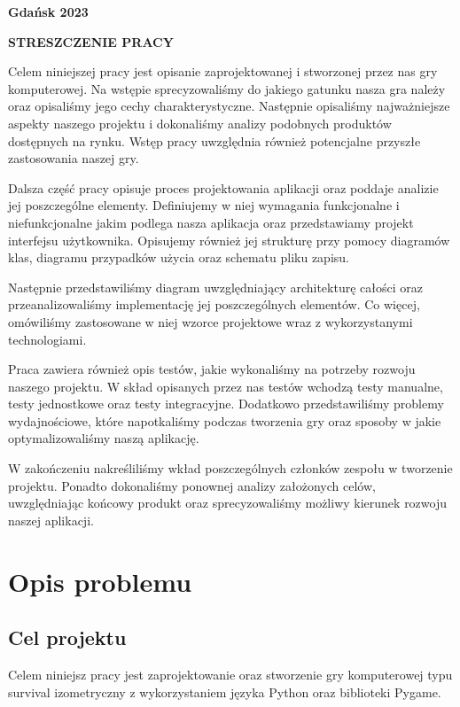 \documentclass{article}
\begin{document}
\vspace{6cm}

\begin{center}
    \textbf{Gdańsk 2023}
\end{center}
\pagestyle{empty}

\newpage
\pagestyle{plain}
\begin{center}
\textbf{\Large{STRESZCZENIE PRACY}}
\end{center}

Celem niniejszej pracy jest opisanie zaprojektowanej i stworzonej przez nas gry komputerowej. Na wstępie sprecyzowaliśmy do jakiego gatunku nasza gra należy oraz opisaliśmy jego cechy charakterystyczne. Następnie opisaliśmy najważniejsze aspekty naszego projektu i dokonaliśmy analizy podobnych produktów dostępnych na rynku. Wstęp pracy uwzględnia również potencjalne przyszłe zastosowania naszej gry.

Dalsza część pracy opisuje proces projektowania aplikacji oraz poddaje analizie jej poszczególne elementy. Definiujemy w niej wymagania funkcjonalne i niefunkcjonalne jakim podlega nasza aplikacja oraz przedstawiamy projekt interfejsu użytkownika. Opisujemy również jej strukturę przy pomocy diagramów klas, diagramu przypadków użycia oraz schematu pliku zapisu.

Następnie przedstawiliśmy diagram uwzględniający architekturę całości oraz przeanalizowaliśmy implementację jej poszczególnych elementów. Co więcej, omówiliśmy zastosowane w niej wzorce projektowe wraz z wykorzystanymi technologiami.

Praca zawiera również opis testów, jakie wykonaliśmy na potrzeby rozwoju naszego projektu. W skład opisanych przez nas testów wchodzą testy manualne, testy jednostkowe oraz testy integracyjne. Dodatkowo przedstawiliśmy problemy wydajnościowe, które napotkaliśmy podczas tworzenia gry oraz sposoby w jakie optymalizowaliśmy naszą aplikację.

W zakończeniu nakreśliliśmy wkład poszczególnych członków zespołu w tworzenie projektu. Ponadto dokonaliśmy ponownej analizy założonych celów, uwzględniając końcowy produkt oraz sprecyzowaliśmy możliwy kierunek rozwoju naszej aplikacji.

\newpage
\tableofcontents
\newpage
\section{Opis problemu}
\subsection{Cel projektu}
Celem niniejsz pracy jest zaprojektowanie oraz stworzenie gry komputerowej typu survival izometryczny z wykorzystaniem języka Python oraz biblioteki Pygame.
\end{document}
